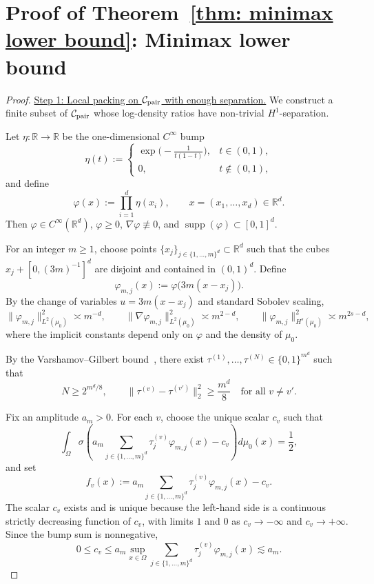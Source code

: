 \documentclass[11pt]{article}
\newcommand{\R}{\mathbb{R}}
\DeclareMathOperator{\supp}{supp}
\theoremstyle{plain}
\theoremstyle{definition}
\theoremstyle{remark}
\newcommand{\proofstep}[1]{\par\medskip\noindent\uline{#1}}
\begin{document}
\section{Proof of Theorem~\ref{thm: minimax lower bound}: Minimax lower bound}
\label{sec:proof_minimax}
\begin{proof}
\proofstep{Step 1: Local packing on \(\mathcal C_{\rm pair}\) with enough separation.}
We construct a finite subset of \(\mathcal C_{\rm pair}\) whose log-density ratios have
non-trivial \(H^1\)-separation.

Let \(\eta:\R\to\R\) be the one-dimensional \(C^\infty\) bump
\[
  \eta(t):=
  \begin{cases}
    \exp\!\big(-\tfrac{1}{t(1-t)}\big), & t\in(0,1),\\[4pt]
    0, & t\notin(0,1),
  \end{cases}
\]
and define
\[
  \varphi(x):=\prod_{i=1}^d \eta(x_i),
  \qquad x=(x_1,\dots,x_d)\in\R^d.
\]
Then \(\varphi\in C^\infty(\R^d)\), \(\varphi\ge0\),
\(\nabla\varphi\not\equiv0\), and
\(\supp(\varphi)\subset[0,1]^d\).

For an integer \(m\ge1\), choose points
\(\{x_j\}_{j\in\{1,\dots,m\}^d}\subset\R^d\) such that the cubes
\(x_j+[0,(3m)^{-1}]^d\) are disjoint and contained in \((0,1)^d\). Define
\[
  \varphi_{m,j}(x):=\varphi\big(3m(x-x_j)\big).
\]
By the change of variables \(u=3m(x-x_j)\) and standard Sobolev scaling,
\begin{equation}\label{eq:phi-scaling}
  \|\varphi_{m,j}\|_{L^2(\mu_0)}^2 \asymp m^{-d},\qquad
  \|\nabla\varphi_{m,j}\|_{L^2(\mu_0)}^2 \asymp m^{2-d},\qquad
  \|\varphi_{m,j}\|_{H^s(\mu_0)}^2 \asymp m^{2s-d},
\end{equation}
where the implicit constants depend only on \(\varphi\) and the density of
\(\mu_0\).

By the Varshamov--Gilbert bound~\cite{takezawa2005introduction}, there exist
\(\tau^{(1)},\dots,\tau^{(N)}\in\{0,1\}^{m^d}\) such that
\[
  N\ge 2^{m^d/8},
  \qquad
  \|\tau^{(v)}-\tau^{(v')}\|_2^2\ge \frac{m^d}{8}
  \quad\text{for all }v\neq v'.
\]

Fix an amplitude \(a_m>0\). For each \(v\), choose the unique scalar \(c_v\)
such that
\[
  \int_\Omega
  \sigma\!\left(
    a_m\sum_{j\in\{1,\dots,m\}^d}\tau_j^{(v)}\varphi_{m,j}(x)-c_v
  \right)
  d\mu_0(x)
  =
  \frac12,
\]
and set
\[
  f_v(x):=
  a_m\sum_{j\in\{1,\dots,m\}^d}\tau_j^{(v)}\varphi_{m,j}(x)-c_v.
\]
The scalar \(c_v\) exists and is unique because the left-hand side is a
continuous strictly decreasing function of \(c_v\), with limits \(1\) and
\(0\) as \(c_v\to-\infty\) and \(c_v\to+\infty\). Since the bump sum is
nonnegative,
\[
  0\le c_v\le
  a_m\sup_{x\in\Omega}
  \sum_{j\in\{1,\dots,m\}^d}\tau_j^{(v)}\varphi_{m,j}(x)
  \lesssim a_m.
\]


\end{proof}
\end{document}
